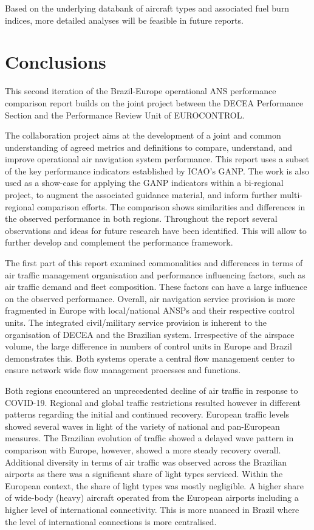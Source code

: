 \documentclass[
  a4paper,
  DIV=11,
  numbers=noendperiod]{scrreprt}
\begin{document}
Based on the underlying databank of aircraft types and associated fuel
burn indices, more detailed analyses will be feasible in future reports.


\hypertarget{conclusions}{%
\chapter{Conclusions}\label{conclusions}}

This second iteration of the Brazil-Europe operational ANS performance
comparison report builds on the joint project between the DECEA
Performance Section and the Performance Review Unit of EUROCONTROL.

The collaboration project aims at the development of a joint and common
understanding of agreed metrics and definitions to compare, understand,
and improve operational air navigation system performance. This report
uses a subset of the key performance indicators established by ICAO's
GANP. The work is also used as a show-case for applying the GANP
indicators within a bi-regional project, to augment the associated
guidance material, and inform further multi-regional comparison efforts.
The comparison shows similarities and differences in the observed
performance in both regions. Throughout the report several observations
and ideas for future research have been identified. This will allow to
further develop and complement the performance framework.

The first part of this report examined commonalities and differences in
terms of air traffic management organisation and performance influencing
factors, such as air traffic demand and fleet composition. These factors
can have a large influence on the observed performance. Overall, air
navigation service provision is more fragmented in Europe with
local/national ANSPs and their respective control units. The integrated
civil/military service provision is inherent to the organisation of
DECEA and the Brazilian system. Irrespective of the airspace volume, the
large difference in numbers of control units in Europe and Brazil
demonstrates this. Both systems operate a central flow management center
to ensure network wide flow management processes and functions.

Both regions encountered an unprecedented decline of air traffic in
response to COVID-19. Regional and global traffic restrictions resulted
however in different patterns regarding the initial and continued
recovery. European traffic levels showed several waves in light of the
variety of national and pan-European measures. The Brazilian evolution
of traffic showed a delayed wave pattern in comparison with Europe,
however, showed a more steady recovery overall.\\
Additional diversity in terms of air traffic was observed across the
Brazilian airports as there was a significant share of light types
serviced. Within the European context, the share of light types was
mostly negligible. A higher share of wide-body (heavy) aircraft operated
from the European airports including a higher level of international
connectivity. This is more nuanced in Brazil where the level of
international connections is more centralised.
\end{document}
